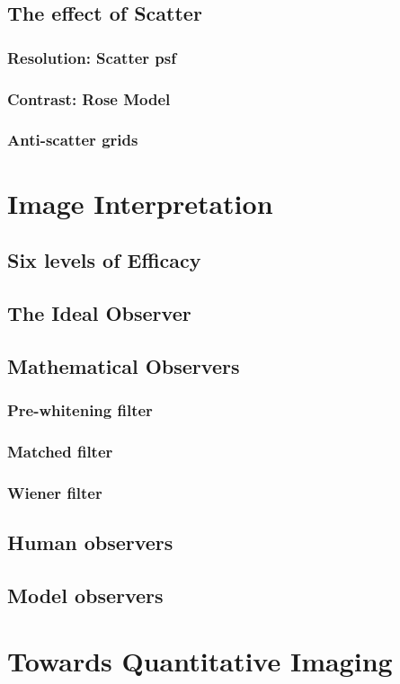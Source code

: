 \documentclass[11pt]{article}
\begin{document}
\subsection{The effect of Scatter}
\subsubsection{Resolution: Scatter psf}
\subsubsection{Contrast: Rose Model}
\subsubsection{Anti-scatter grids}

\newpage
\section{Image Interpretation}
\subsection{Six levels of Efficacy}
\subsection{The Ideal Observer}
\subsection{Mathematical Observers}
\subsubsection{Pre-whitening filter}
\subsubsection{Matched filter}
\subsubsection{Wiener filter}
\subsection{Human observers}
\subsection{Model observers}

\newpage
\section{Towards Quantitative Imaging}
\end{document}
